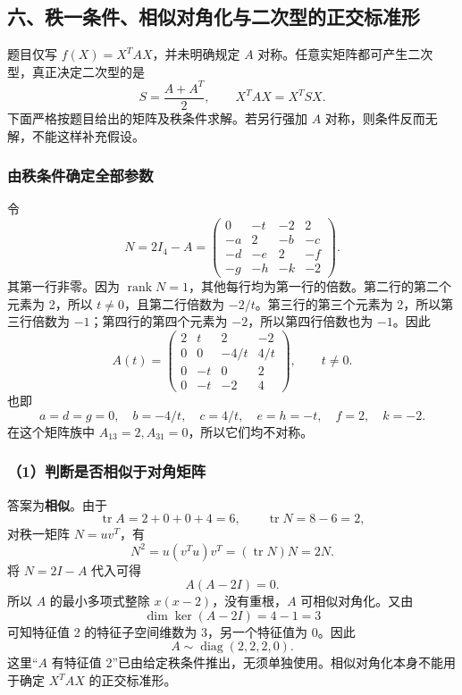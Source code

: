 \documentclass[11pt,fontset=fandol]{ctexart}
\begin{document}
\subsection{六、秩一条件、相似对角化与二次型的正交标准形}\label{ux516dux79e9ux4e00ux6761ux4ef6ux76f8ux4f3cux5bf9ux89d2ux5316ux4e0eux4e8cux6b21ux578bux7684ux6b63ux4ea4ux6807ux51c6ux5f62}

题目仅写 \(f(X)=X^TAX\)，并未明确规定 \(A\)
对称。任意实矩阵都可产生二次型，真正决定二次型的是 \[
S=\frac{A+A^T}{2},\qquad X^TAX=X^TSX.
\] 下面严格按题目给出的矩阵及秩条件求解。若另行强加 \(A\)
对称，则条件反而无解，不能这样补充假设。

\subsubsection{由秩条件确定全部参数}\label{ux7531ux79e9ux6761ux4ef6ux786eux5b9aux5168ux90e8ux53c2ux6570}

令 \[
N=2I_4-A
=\begin{pmatrix}
0&-t&-2&2\\
-a&2&-b&-c\\
-d&-e&2&-f\\
-g&-h&-k&-2
\end{pmatrix}.
\] 其第一行非零。因为
\(\operatorname{rank}N=1\)，其他每行均为第一行的倍数。第二行的第二个元素为
2，所以 \(t\neq0\)，且第二行倍数为 \(-2/t\)。第三行的第三个元素为
2，所以第三行倍数为 \(-1\)；第四行的第四个元素为
\(-2\)，所以第四行倍数也为 \(-1\)。因此 \[
\boxed{
A(t)=\begin{pmatrix}
2&t&2&-2\\
0&0&-4/t&4/t\\
0&-t&0&2\\
0&-t&-2&4
\end{pmatrix},\qquad t\neq0.}
\] 也即 \[
a=d=g=0,\quad b=-4/t,\quad c=4/t,\quad
e=h=-t,\quad f=2,\quad k=-2.
\] 在这个矩阵族中 \(A_{13}=2,A_{31}=0\)，所以它们均不对称。

\subsubsection{（1）判断是否相似于对角矩阵}\label{ux5224ux65adux662fux5426ux76f8ux4f3cux4e8eux5bf9ux89d2ux77e9ux9635}

答案为\textbf{相似}。由于 \[
\operatorname{tr}A=2+0+0+4=6,\qquad
\operatorname{tr}N=8-6=2,
\] 对秩一矩阵 \(N=uv^T\)，有 \[
N^2=u(v^Tu)v^T=(\operatorname{tr}N)N=2N.
\] 将 \(N=2I-A\) 代入可得 \[
A(A-2I)=0.
\] 所以 \(A\) 的最小多项式整除 \(x(x-2)\)，没有重根，\(A\)
可相似对角化。又由 \[
\dim\ker(A-2I)=4-1=3
\] 可知特征值 2 的特征子空间维数为 3，另一个特征值为 0。因此 \[
\boxed{A\sim\operatorname{diag}(2,2,2,0).}
\] 这里``\(A\) 有特征值
2''已由给定秩条件推出，无须单独使用。相似对角化本身不能用于确定
\(X^TAX\) 的正交标准形。
\end{document}

